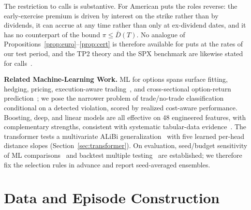 \documentclass[sigconf,review,anonymous]{acmart}
\begin{document}
The restriction to calls is substantive. For American puts the roles reverse: the early-exercise premium is driven by interest on the strike rather than by dividends, it can accrue at any time rather than only at ex-dividend dates, and it has no counterpart of the bound $\pi\le\bar D(T)$. No analogue of Propositions~\ref{prop:euro}--\ref{prop:cert} is therefore available for puts at the rates of our test period, and the TP2 theory and the SPX benchmark are likewise stated for calls~\cite{glasserman2026tp2theory,glasserman2025tp2}.

\medskip\noindent\textbf{Related Machine-Learning Work.}
ML for options spans surface fitting, hedging, pricing, execution-aware trading~\cite{kearns2013mlmicrostructure}, and cross-sectional option-return prediction~\cite{bali2023option}; we pose the narrower problem of trade/no-trade classification conditional on a detected violation, scored by realized cost-aware performance. Boosting, deep, and linear models are all effective on 48 engineered features, with complementary strengths, consistent with systematic tabular-data evidence~\cite{grinsztajn2022why,gorishniy2021revisiting}. The transformer tests a multivariate ALiBi generalization~\cite{press2022alibi,shaw2018self} with five learned per-head distance slopes (Section~\ref{sec:transformer}). On evaluation, seed/budget sensitivity of ML comparisons~\cite{melis2018state,lucic2018gans,agarwal2021deep,bouthillier2021accounting,dodge2019show} and backtest multiple testing~\cite{white2000reality,harvey2016crosssection,bailey2014deflated} are established; we therefore fix the selection rules in advance and report seed-averaged ensembles.

\section{Data and Episode Construction}
\label{sec:data}
\end{document}
